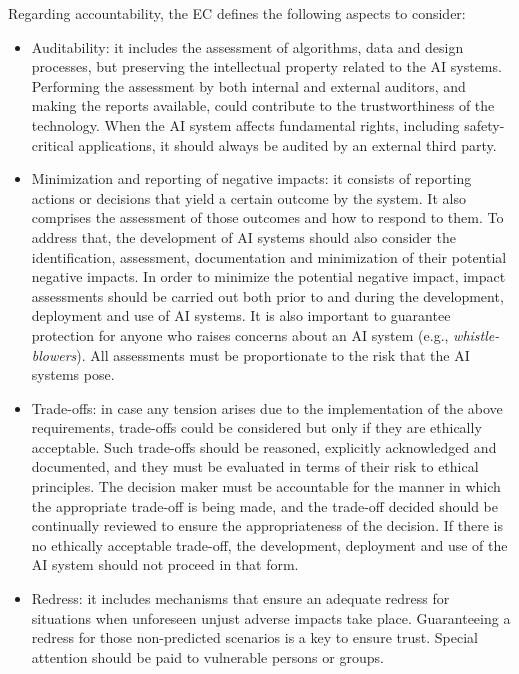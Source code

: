 \documentclass[final]{elsarticle}
\begin{document}
Regarding accountability, the EC \cite{hleg2019high} defines the following aspects to consider:
    \begin{itemize}[leftmargin=*]
    \item Auditability: it includes the assessment of algorithms, data and design processes, but preserving the intellectual property related to the AI systems. Performing the assessment by both internal and external auditors, and making the reports available, could contribute to the trustworthiness of the technology. When the AI system affects fundamental rights, including safety-critical applications, it should always be audited by an external third party.
    
    \item Minimization and reporting of negative impacts: it consists of reporting actions or decisions that yield a certain outcome by the system. It also comprises the assessment of those outcomes and how to respond to them. To address that, the development of AI systems should also consider the identification, assessment, documentation and minimization of their potential negative impacts. In order to minimize the potential negative impact, impact assessments should be carried out both prior to and during the development, deployment and use of AI systems. It is also important to guarantee protection for anyone who raises concerns about an AI system (e.g., \emph{whistle-blowers}). All assessments must be proportionate to the risk that the AI systems pose.
    
    \item Trade-offs: in case any tension arises due to the implementation of the above requirements, trade-offs could be considered but only if they are ethically acceptable. Such trade-offs should be reasoned, explicitly acknowledged and documented, and they must be evaluated in terms of their risk to ethical principles. The decision maker must be accountable for the manner in which the appropriate trade-off is being made, and the trade-off decided should be continually reviewed to ensure the appropriateness of the decision. If there is no ethically acceptable trade-off, the development, deployment and use of the AI system should not proceed in that form.
    
    \item Redress: it includes mechanisms that ensure an adequate redress for situations when unforeseen unjust adverse impacts take place. Guaranteeing a redress for those non-predicted scenarios is a key to ensure trust. Special attention should be paid to vulnerable persons or groups. 
    \end{itemize}
\end{document}
